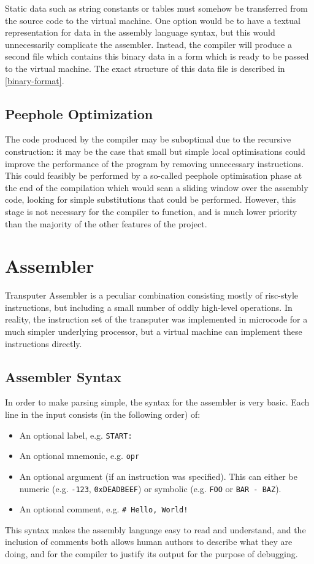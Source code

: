 Static data such as string constants or tables must somehow be transferred from
the source code to the virtual machine. One option would be to have a textual
representation for data in the assembly language syntax, but this would
unnecessarily complicate the assembler. Instead, the compiler will produce a
second file which contains this binary data in a form which is ready to be
passed to the virtual machine. The exact structure of this data file is
described in \ref{binary-format}.

\subsection{Peephole Optimization}

The code produced by the compiler may be suboptimal due to the recursive
construction: it may be the case that small but simple local optimisations could
improve the performance of the program by removing unnecessary instructions.
This could feasibly be performed by a so-called peephole optimisation phase at
the end of the compilation which would scan a sliding window over the assembly
code, looking for simple substitutions that could be performed. However, this
stage is not necessary for the compiler to function, and is much lower priority
than the majority of the other features of the project.

\section{Assembler}

Transputer Assembler is a peculiar combination consisting mostly of
\gls{risc}-style instructions, but including a small number of oddly high-level
operations. In reality, the instruction set of the transputer was implemented in
microcode for a much simpler underlying processor, but a virtual machine can
implement these instructions directly.

\subsection{Assembler Syntax} \label{asm-syntax}

In order to make parsing simple, the syntax for the assembler is very basic.
Each line in the input consists (in the following order) of:
\begin{itemize}
  \item An optional label, e.g. \texttt{START:}
  \item An optional \gls{mnemonic}, e.g. \texttt{opr}
  \item An optional argument (if an instruction was specified). This can either
        be numeric (e.g. \texttt{-123}, \texttt{0xDEADBEEF}) or symbolic
        (e.g. \texttt{FOO} or \texttt{BAR - BAZ}).
  \item An optional comment, e.g. \texttt{\# Hello, World!}
\end{itemize}
This syntax makes the assembly language easy to read and understand, and the
inclusion of comments both allows human authors to describe what they are doing,
and for the compiler to justify its output for the purpose of debugging.

